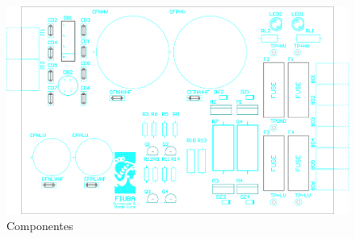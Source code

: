\begin{figure}[H]
    \centering
    \includegraphics[width=150mm, angle=90]{img/PCB/layers/power_supply/top-overlay.png}
    \caption{\footnotesize{Componentes}}
    \label{fig:pcb_preamp_top_overlay}
\end{figure}

\clearpage
















